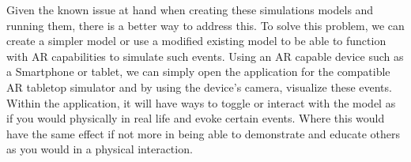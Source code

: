 Given the known issue at hand when creating these simulations models and running them, there is a better way to address this. To solve this problem, we can create a simpler model or use a modified existing model to be able to function with AR capabilities to simulate such events. Using an AR capable device such as a Smartphone or tablet, we can simply open the application for the compatible AR tabletop simulator and by using the device’s camera, visualize these events. Within the application, it will have ways to toggle or interact with the model as if you would physically in real life and evoke certain events. Where this would have the same effect if not more in being able to demonstrate and educate others as you would in a physical interaction. 